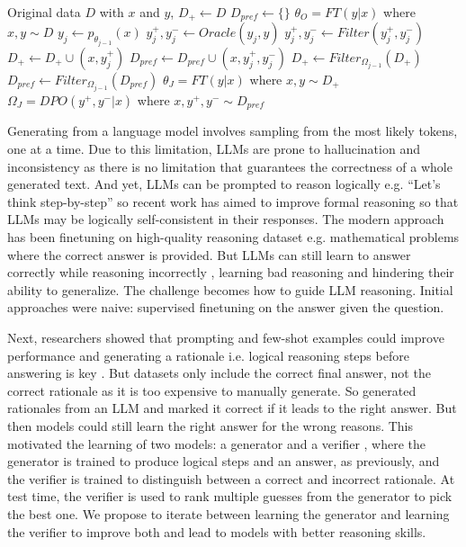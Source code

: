 \begin{algorithm*}[tb]
   \caption{Iterative Refinement}
   \label{alg:example}
\begin{algorithmic}
    Original data $D$ with $x$ and $y$,
   \STATE $D_{+} \gets D $ 
   \STATE $D_{pref} \gets \{\} $ 
   \STATE $\theta_O = FT(y | x)$ where $x , y \sim D $ 
    \STATE $y_j \gets p_{\theta_{j-1}}(x)$  
    \STATE $y_j^{+} , y_j^{-} \gets Oracle(y_j, y)$
    \STATE $y_j^{+} , y_j^{-} \gets Filter(y_j^{+} , y_j^{-})$
    \STATE $D_{+} \gets D_{+} \cup (x,y_j^{+}) $
    \STATE $D_{pref} \gets D_{pref} \cup (x,y_j^{+}, y_j^{-}) $
    \STATE $D_{+} \gets Filter_{\Omega_{j-1}}(D_{+})$
    \STATE $D_{pref} \gets Filter_{\Omega_{j-1}}(D_{pref})$
    \STATE $\theta_J = FT(y | x)$ where $x , y \sim D_+ $
    \STATE $\Omega_J = DPO(y^{+} , y^{-}  | x)$ where $x , y^{+} , y^{-} \sim D_{pref} $

   \ENDFOR
\end{algorithmic}
\end{algorithm*}



Generating from a language model involves sampling from the most likely tokens, one at a time. Due to this limitation, LLMs are prone to hallucination and inconsistency as there is no limitation that guarantees the correctness of a whole generated text. And yet, LLMs can be prompted to reason logically e.g. ``Let's think step-by-step'' \citep{wei_chain--thought_2022} so recent work has aimed to improve formal reasoning so that LLMs may be logically self-consistent in their responses. The modern approach has been finetuning on high-quality reasoning dataset e.g. mathematical problems \citep{cobbe_training_2021} where the correct answer is provided. But LLMs can still learn to answer correctly while reasoning incorrectly \citep{lightman_lets_2023}, learning bad reasoning and hindering their ability to generalize. The challenge becomes how to guide LLM reasoning. Initial approaches were naive: supervised finetuning on the answer given the question.

Next, researchers showed that prompting and few-shot examples could improve performance \citep{wei_chain--thought_2022} and generating a rationale i.e. logical reasoning steps before answering is key \citep{lightman_lets_2023}. But datasets only include the correct final answer, not the correct rationale as it is too expensive to manually generate. So \citet{zelikman_star_2022} generated rationales from an LLM and marked it correct if it leads to the right answer. But then models could still learn the right answer for the wrong reasons. This motivated the learning of two models: a generator and a verifier \citep{cobbe_training_2021, lightman_lets_2023}, where the generator is trained to produce logical steps and an answer, as previously, and the verifier is trained to distinguish between a correct and incorrect rationale. At test time, the verifier is used to rank multiple guesses from the generator to pick the best one. We propose to iterate between learning the generator and learning the verifier to improve both and lead to models with better reasoning skills.



